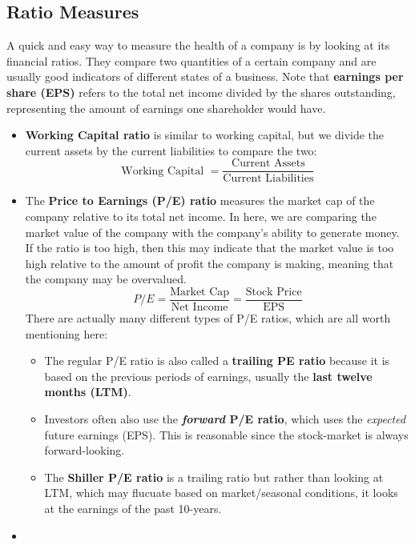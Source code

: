 \documentclass{article}
\begin{document}
\subsection*{Ratio Measures}
A quick and easy way to measure the health of a company is by looking at its financial ratios. They compare two quantities of a certain company and are usually good indicators of different states of a business. Note that \textbf{earnings per share (EPS)} refers to the total net income divided by the shares outstanding, representing the amount of earnings one shareholder would have.
\begin{itemize}
\item
\textbf{Working Capital ratio} is similar to working capital, but we divide the current assets by the current liabilities to compare the two:
\begin{equation}
  \text{Working Capital } = \frac{\text{Current Assets}}{\text{Current Liabilities}}
\end{equation}
\item
The \textbf{Price to Earnings (P/E) ratio} measures the market cap of the company relative to its total net income. In here, we are comparing the market value of the company with the company's ability to generate money. If the ratio is too high, then this may indicate that the market value is too high relative to the amount of profit the company is making, meaning that the company may be overvalued.
\begin{equation}
  P/E = \frac{\text{Market Cap}}{\text{Net Income}} = \frac{\text{Stock Price}}{\text{EPS}}
\end{equation}
There are actually many different types of P/E ratios, which are all worth mentioning here:
\begin{itemize}
\item
The regular P/E ratio is also called a \textbf{trailing PE ratio} because it is based on the previous periods of earnings, usually the \textbf{last twelve months (LTM)}.
\item
Investors often also use the \textbf{\textit{forward} P/E ratio}, which uses the \textit{expected} future earnings (EPS). This is reasonable since the stock-market is always forward-looking.
\item
The \textbf{Shiller P/E ratio} is a trailing ratio but rather than looking at LTM, which may flucuate based on market/seasonal conditions, it looks at the earnings of the past 10-years.
\end{itemize}
\item

\end{itemize}
\end{document}
